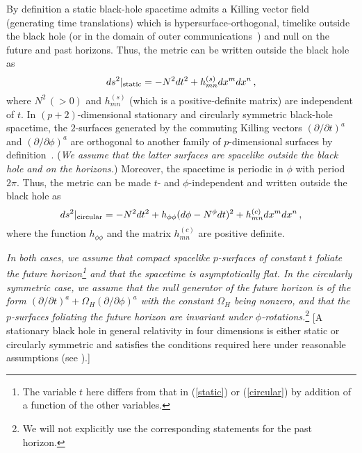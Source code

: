 \documentclass[a4paper,12pt]{article}
\begin{document}
By definition a static black-hole spacetime admits a Killing vector field
(generating time translations) 
which is hypersurface-orthogonal, timelike outside
the black hole (or in the domain of outer communications~\cite{Carter}) and
null on the future and past horizons. 
Thus, the metric 
can be written outside the black hole as 
\begin{equation}
ds^2|_{\rm static} = -N^2 dt^2 + h^{(s)}_{mn}dx^m dx^n\,,
\label{static}
\end{equation}
where $N^2\,(>0)$ and $h^{(s)}_{mn}$ (which is a positive-definite matrix) are 
independent of $t$. 
In $(p+2)$-dimensional stationary and circularly symmetric black-hole
spacetime, the $2$-surfaces generated by the commuting 
Killing vectors $(\partial/\partial t)^a$
and $(\partial/\partial\phi)^a$ are orthogonal to another
family of $p$-dimensional surfaces by definition~\cite{Carter,Carter2}. 
({\it We assume that the latter surfaces are spacelike outside the black hole
and on the horizons.})
Moreover, the
spacetime is periodic in $\phi$ with period $2\pi$.  Thus, the metric
can be made 
$t$- and $\phi$-independent and written outside the black hole as 
\begin{equation}
ds^2|_{\rm circular} = -N^2 dt^2 + h_{\phi\phi}(d\phi - N^\phi dt)^2
+ h^{(c)}_{mn}dx^m dx^n\,, \label{circular}
\end{equation}
where the function $h_{\phi\phi}$ and the matrix $h^{(c)}_{mn}$ are
positive definite.  

{\it In both cases, we assume that
compact spacelike $p$-surfaces of constant $t$ foliate the future 
horizon\footnote{The variable $t$
here differs from that in (\ref{static}) or (\ref{circular}) by
addition of a function of the other variables.}
and that the spacetime is asymptotically flat.
In the circularly symmetric case,
we assume that the null generator of the future horizon is of the form
$(\partial/\partial t)^a + \Omega_H(\partial/\partial \phi)^a$ 
with the constant $\Omega_H$ being nonzero,
and that the $p$-surfaces foliating the future horizon are invariant under
$\phi$-rotations.}\footnote{We will not explicitly 
use the corresponding statements for the past horizon.}
[A stationary black hole
in general relativity in four dimensions is either static or circularly 
symmetric and
satisfies the conditions required here
under reasonable assumptions (see \cite{Hawking,Carter}).]
\end{document}
